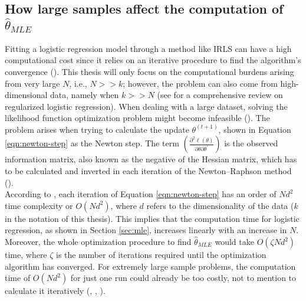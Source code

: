 \subsection{How large samples affect the computation of $\widehat{\theta}_{MLE}$}
\label{sec:comput-problem}


Fitting a logistic regression model through a method like IRLS can have a high computational cost since it relies on an iterative procedure to find the algorithm's convergence (\cite{hastie2009elements}). This thesis will only focus on the computational burdens arising from very large $N$, i.e., $N >> k$; however, the problem can also come from high-dimensional data, namely when $k >> N$ (see \textcite{koh2007} for a comprehensive review on regularized logistic regression). When dealing with a large dataset, solving the likelihood function optimization problem might become infeasible (\cite{han2020local}). The problem arises when trying to calculate the update $\theta^{(t+1)}$, shown in Equation \ref{eqn:newton-step} as the Newton step. The term $\left( \frac{\partial^2 \ell(\theta)}{\partial \theta \partial \theta^\prime} \right)$ is the observed information matrix, also known as the negative of the Hessian matrix, which has to be calculated and inverted in each iteration of the Newton–Raphson method (\cite{yu2023}).\\

According to \cite{wang2018optimal}, each iteration of Equation \ref{eqn:newton-step} has an order of $Nd^2$ time complexity or $O(Nd^2)$, where $d$ refers to the dimensionality of the data ($k$ in the notation of this thesis). This implies that the computation time for logistic regression, as shown in Section \ref{sec:mle}, increases linearly with an increase in $N$. Moreover, the whole optimization procedure to find $\widehat{\theta}_{MLE}$  would take $O(\zeta Nd^2)$ time, where $\zeta$ is the number of iterations required until the optimization algorithm has converged. For extremely large sample problems, the computation time of $O(Nd^2)$ for just one run could already be too costly, not to mention to calculate it iteratively (\cite{wang2018optimal}, \cite{wang2019moreefficient}, \cite{cheng2020}). 
